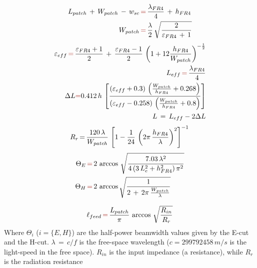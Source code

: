 \documentclass[12pt,a4paper]{article}
\begin{document}
{\begin{equation}
	\begin{aligned}L_{patch}\,+\,W_{patch}\,-\,w_{sc}\,&{\color{Mahogany}=}\,\frac{\lambda_{FR4}}{4}\,+\,h_{FR4}\\
		W_{patch}\,&{\color{Mahogany}=}\,\frac{\lambda}{2}\,\sqrt{\frac{2}{\varepsilon_{FR4}\,+\,1}}\\
	\end{aligned}
\end{equation}
\begin{equation}
	\begin{aligned}
		\varepsilon_{eff}\,{\color{Mahogany}=}\,\frac{\varepsilon_{FR4}+1}{2}\,+\,\frac{\varepsilon_{FR4}-1}{2}\,\left(1+12\frac{h_{FR4}}{W_{patch}}\right)^{-\frac{1}{2}}\\
		L_{eff}\,{\color{Mahogany}=}\,\frac{\lambda_{FR4}}{4}\\
		\Delta L{\color{Mahogany}=}0.412\,h\,\left[\frac{(\varepsilon_{eff}+0.3)\,\left(\frac{W_{patch}}{h_{FR4}}+0.268\right)}{(\varepsilon_{eff}-0.258)\,\left(\frac{W_{patch}}{h_{FR4}}+0.8\right)}\right]\\
		L\,=\,L_{eff}-2\Delta L
	\end{aligned}
\end{equation}
\begin{equation}
R_r\,{=}\,\frac{120\,\lambda}{W_{patch}}\,\left[1-\frac{1}{24}\,\left(2\pi\,\frac{h_{FR4}}{\lambda}\right)^{2}\right]^{-1}\\
\end{equation}
\begin{equation}
	\begin{aligned}
		\Theta_E\,&{\color{Mahogany}=}\,2\,\arccos\,\sqrt{\frac{7.03\,\lambda^2}{4\,(3\,L_e^2+h_{FR4}^2)\,\pi^2}}\\
		\Theta_H\,&{\color{Mahogany}=}\,2\,\arccos\sqrt{\frac{1}{2\,+\,2\pi\,\frac{W_{patch}}{\lambda}}}\\
	\end{aligned}
\end{equation}

\begin{equation}
	\ell_{feed}\,{\color{Mahogany}=}\,\frac{L_{patch}}{\pi}\,\arccos\,\sqrt{\frac{R_{in}}{R_r}}
\end{equation}
Where $\Theta_i$ ($i=\{E,H\}$) are the half-power beamwidth values given by the E-cut and the H-cut. $\lambda\,=\,c/f$ is the free-space wavelength ($c=299 792 458\,m/s$ is the light-speed in the free space). $R_{in}$ is the input impedance (a resistance), while $R_r$ is the radiation resistance
}
\end{document}
